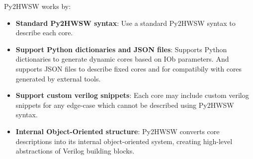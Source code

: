 %

Py2HWSW works by:
\begin{itemize}
    \item \textbf{Standard Py2HWSW syntax}: Use a standard Py2HWSW
      syntax to describe each core.
    \item \textbf{Support Python dictionaries and JSON files}: Supports Python
      dictionaries to generate dynamic cores based on IOb parameters. And
      supports JSON files to describe fixed cores and for compatibily with cores
      generated by external tools.
    \item \textbf{Support custom verilog snippets}: Each core may include custom
      verilog snippets for any edge-case which cannot be described using Py2HWSW
      syntax.
    \item \textbf{Internal Object-Oriented structure}: Py2HWSW converts core
      descriptions into its internal object-oriented system, creating high-level
      abstractions of Verilog building blocks.
\end{itemize}
